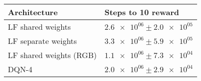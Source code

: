 \begin{tabular}{ll}
\hline
 Architecture            & Steps to 10 reward                \\
\hline
 LF shared weights       & $\num{2.6e+06} \pm \num{2.0e+05}$ \\
 LF separate weights     & $\num{3.3e+06} \pm \num{5.9e+05}$ \\
 LF shared weights (RGB) & $\num{1.1e+06} \pm \num{7.3e+04}$ \\
 DQN-4                   & $\num{2.0e+06} \pm \num{2.9e+04}$ \\
\hline
\end{tabular}